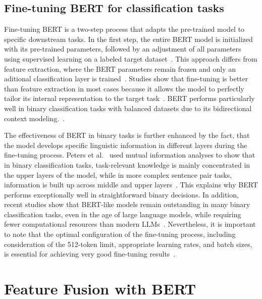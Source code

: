 \subsection{Fine-tuning BERT for classification tasks}
Fine-tuning BERT is a two-step process that adapts the pre-trained model to specific downstream tasks. In the first step, the entire BERT model is initialized with its pre-trained parameters, followed by an adjustment of all parameters using supervised learning on a labeled target dataset~\cite{devlin2019bert, sun2020finetuneberttextclassification}. This approach differs from feature extraction, where the BERT parameters remain frozen and only an aditional classification layer is trained~\cite{peters-fintune}. Studies show that fine-tuning is better than feature extraction in most cases because it allows the model to perfectly tailor its internal representation to the target task~\cite{peters-fintune, sun2020finetuneberttextclassification}.
BERT performs particularly well in binary classification tasks with balanced datasets due to its bidirectional context modeling.~\cite{bilal2022effectiveness}. 

The effectiveness of BERT in binary tasks is further enhanced by the fact, that the model develops specific linguistic information in different layers during the fine-tuning process. Peters et al.~\cite{peters-fintune} used mutual information analyses to show that in binary classification tasks, task-relevant knowledge is mainly concentrated in the upper layers of the model, while in more complex sentence pair tasks, information is built up across middle and upper layers~\cite{peters-fintune}. This explains why BERT performs exceptionally well in straightforward binary decisions.
In addition, recent studies show that BERT-like models remain outstanding in many binary classification tasks, even in the age of large language models, while requiring fewer computational resources than modern LLMs~\cite{zhang2025bert}. Nevertheless, it is important to note that the optimal configuration of the fine-tuning process, including consideration of the 512-token limit, appropriate learning rates, and batch sizes, is essential for achieving very good fine-tuning results~\cite{sun2020finetuneberttextclassification, bilal2022effectiveness}.

\section{Feature Fusion with BERT}

